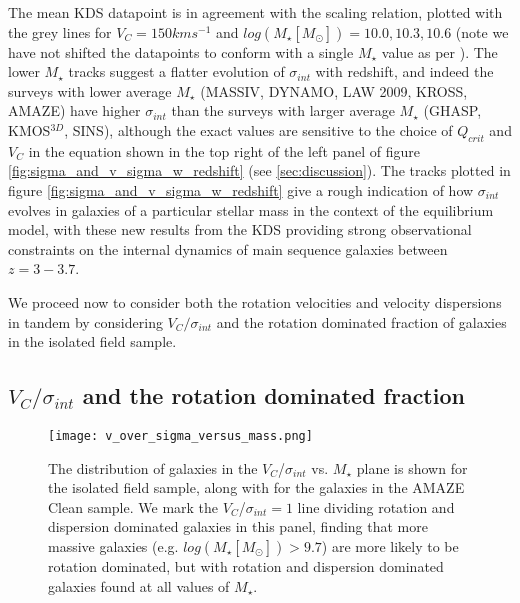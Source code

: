 \documentclass[fleqn,usenatbib]{mn2e}
\begin{document}
The mean KDS datapoint is in agreement with the scaling relation, plotted with the grey lines for $V_{C} = 150kms^{-1}$ and $log(M_{\star}[M_{\odot}])=10.0,10.3,10.6$ (note we have not shifted the datapoints to conform with a single $M_{\star}$ value as per \cite{Wisnioski2015}).
The lower $M_{\star}$ tracks suggest a flatter evolution of $\sigma_{int}$ with redshift, and indeed the surveys with lower average $M_{\star}$ (MASSIV, DYNAMO, LAW 2009, KROSS, AMAZE) have higher $\sigma_{int}$ than the surveys with larger average $M_{\star}$ (GHASP, KMOS$^{3D}$, SINS), although the exact values are sensitive to the choice of $Q_{crit}$ and $V_{C}$ in the equation shown in the top right of the left panel of figure \ref{fig:sigma_and_v_sigma_w_redshift} (see \cref{sec:discussion}).
The tracks plotted in figure \ref{fig:sigma_and_v_sigma_w_redshift} give a rough indication of how $\sigma_{int}$ evolves in galaxies of a particular stellar mass in the context of the equilibrium model, with these new results from the KDS providing strong observational constraints on the internal dynamics of main sequence galaxies between $z=3-3.7$.

We proceed now to consider both the rotation velocities and velocity dispersions in tandem by considering $V_{C}/\sigma_{int}$ and the rotation dominated fraction of galaxies in the isolated field sample.


\subsection{$V_{C}/\sigma_{int}$ and the rotation dominated fraction}\label{subsec:rdf_v_over_sigma}

\begin{figure}
    \centering \hspace{-1.13cm}
    \texttt{[image: v\_over\_sigma\_versus\_mass.png]}
    \caption{The distribution of galaxies in the $V_{C}$/$\sigma_{int}$ vs. $M_{\star}$ plane is shown for the isolated field sample, along with for the galaxies in the AMAZE Clean sample.
    We mark the $V_{C}$/$\sigma_{int}=1$ line dividing rotation and dispersion dominated galaxies in this panel, finding that more massive galaxies (e.g. $log(M_{\star}[M_{\odot}]) > 9.7$) are more likely to be rotation dominated, but with rotation and dispersion dominated galaxies found at all values of $M_{\star}$.}
    \label{fig:v_sig_and_v}
\end{figure}
\end{document}
